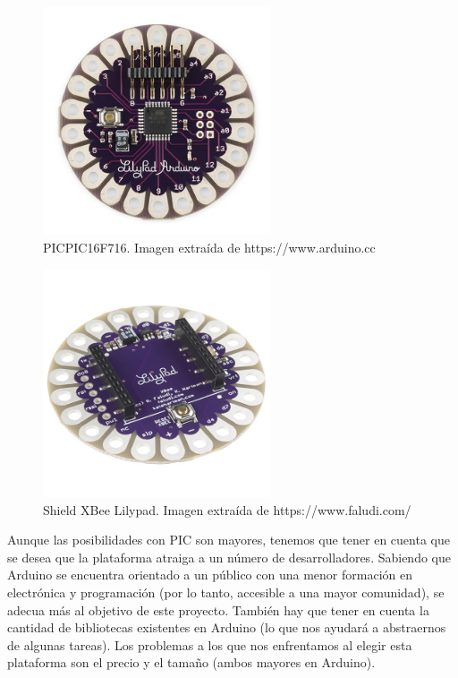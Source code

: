 \begin{figure}[htb]
\centering
\includegraphics[width=0.6\textwidth]{./imagenes/lilypad}
\caption{PICPIC16F716. Imagen extraída de \scriptsize{https://www.arduino.cc}} \label{fig:lilypad}
\end{figure}


\begin{figure}[htb]
\centering
\includegraphics[width=0.6\textwidth]{./imagenes/lilypadxbee}
\caption{Shield XBee Lilypad. Imagen extraída de \scriptsize{https://www.faludi.com/ \cite{faludi}}} \label{fig:lilypadxbee}
\end{figure}

Aunque las posibilidades con PIC son mayores, tenemos que tener en cuenta que se desea que la
plataforma atraiga a un número de desarrolladores. Sabiendo que Arduino se encuentra orientado a un
público con una menor formación en electrónica y programación (por lo tanto, accesible a una mayor comunidad), se
adecua más al objetivo de este proyecto. También hay que tener en cuenta la cantidad de bibliotecas
existentes en Arduino (lo que nos ayudará a abstraernos de algunas tareas). Los problemas a los que
nos enfrentamos al elegir esta plataforma son el precio y el tamaño (ambos mayores en Arduino).\\
